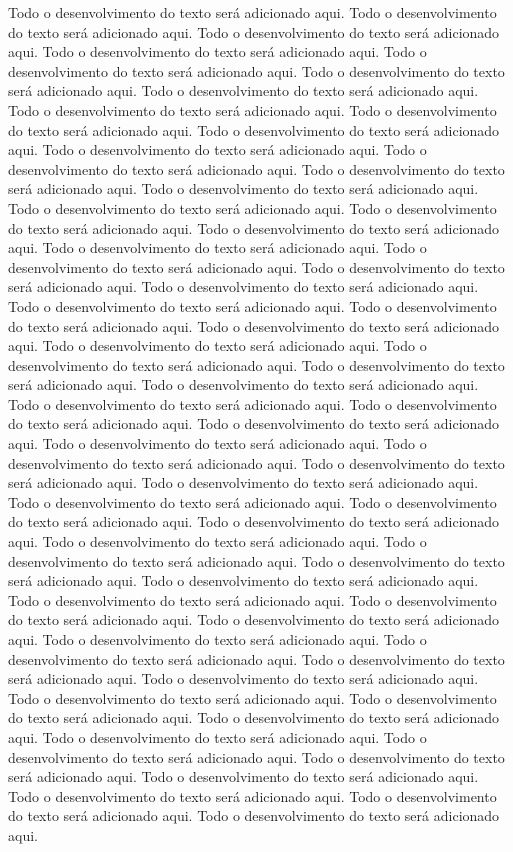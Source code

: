 Todo o desenvolvimento do texto será adicionado aqui.
Todo o desenvolvimento do texto será adicionado aqui.
Todo o desenvolvimento do texto será adicionado aqui.
Todo o desenvolvimento do texto será adicionado aqui.
Todo o desenvolvimento do texto será adicionado aqui.
Todo o desenvolvimento do texto será adicionado aqui.
Todo o desenvolvimento do texto será adicionado aqui.
Todo o desenvolvimento do texto será adicionado aqui.
Todo o desenvolvimento do texto será adicionado aqui.
Todo o desenvolvimento do texto será adicionado aqui.
Todo o desenvolvimento do texto será adicionado aqui.
Todo o desenvolvimento do texto será adicionado aqui.
Todo o desenvolvimento do texto será adicionado aqui.
Todo o desenvolvimento do texto será adicionado aqui.
Todo o desenvolvimento do texto será adicionado aqui.
Todo o desenvolvimento do texto será adicionado aqui.
Todo o desenvolvimento do texto será adicionado aqui.
Todo o desenvolvimento do texto será adicionado aqui.
Todo o desenvolvimento do texto será adicionado aqui.
Todo o desenvolvimento do texto será adicionado aqui.
Todo o desenvolvimento do texto será adicionado aqui.
Todo o desenvolvimento do texto será adicionado aqui.
Todo o desenvolvimento do texto será adicionado aqui.
Todo o desenvolvimento do texto será adicionado aqui.
Todo o desenvolvimento do texto será adicionado aqui.
Todo o desenvolvimento do texto será adicionado aqui.
Todo o desenvolvimento do texto será adicionado aqui.
Todo o desenvolvimento do texto será adicionado aqui.
Todo o desenvolvimento do texto será adicionado aqui.
Todo o desenvolvimento do texto será adicionado aqui.
Todo o desenvolvimento do texto será adicionado aqui.
Todo o desenvolvimento do texto será adicionado aqui.
Todo o desenvolvimento do texto será adicionado aqui.
Todo o desenvolvimento do texto será adicionado aqui.
Todo o desenvolvimento do texto será adicionado aqui.
Todo o desenvolvimento do texto será adicionado aqui.
Todo o desenvolvimento do texto será adicionado aqui.
Todo o desenvolvimento do texto será adicionado aqui.
Todo o desenvolvimento do texto será adicionado aqui.
Todo o desenvolvimento do texto será adicionado aqui.
Todo o desenvolvimento do texto será adicionado aqui.
Todo o desenvolvimento do texto será adicionado aqui.
Todo o desenvolvimento do texto será adicionado aqui.
Todo o desenvolvimento do texto será adicionado aqui.
Todo o desenvolvimento do texto será adicionado aqui.
Todo o desenvolvimento do texto será adicionado aqui.
Todo o desenvolvimento do texto será adicionado aqui.
Todo o desenvolvimento do texto será adicionado aqui.
Todo o desenvolvimento do texto será adicionado aqui.
Todo o desenvolvimento do texto será adicionado aqui.
Todo o desenvolvimento do texto será adicionado aqui.
Todo o desenvolvimento do texto será adicionado aqui.
Todo o desenvolvimento do texto será adicionado aqui.
Todo o desenvolvimento do texto será adicionado aqui.
Todo o desenvolvimento do texto será adicionado aqui.
Todo o desenvolvimento do texto será adicionado aqui.
Todo o desenvolvimento do texto será adicionado aqui.
Todo o desenvolvimento do texto será adicionado aqui.
Todo o desenvolvimento do texto será adicionado aqui.